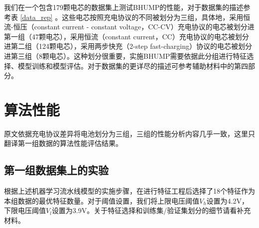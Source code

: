 \documentclass{article}
\begin{document}
我们在一个包含179颗电芯的数据集上测试BHUMP的性能，对于数据集的描述参考表 \ref{data_rep} 。这些电芯按照充电协议的不同被划分为三组，具体地，采用恒流-恒压（constant current - constant voltage，CC-CV）充电协议的电芯被划分进第一组（47颗电芯），采用恒流（constant current，CC）充电协议的电芯被划分进第二组（124颗电芯），采用两步快充（2-step fast-charging）协议的电芯被划分进第三组（8颗电芯）。这种划分很重要，实施BHUMP需要依据此分组进行特征选择、模型训练和模型评估。对于数据集的更详尽的描述可参考辅助材料中的第四部分。

\section{算法性能}

原文依据充电协议差异将电池划分为三组，三组的性能分析内容几乎一致，这里只翻译第一组数据的算法性能评估结果。

\subsection{第一组数据集上的实验}

根据上述机器学习流水线模型的实施步骤，在进行特征工程后选择了18个特征作为本组数据的最优特征数量。对于阈值设置，我们将上限电压阈值$V_h$设置为4.2V，下限电压阈值$V_l$设置为3.9V。关于特征选择和训练集/验证集划分的细节请看补充材料。

\begin{table}[h!]
\centering
{}
\caption{38号电池的预测性能}
\label{results_group1_cell_38}
\end{table}
\end{document}

